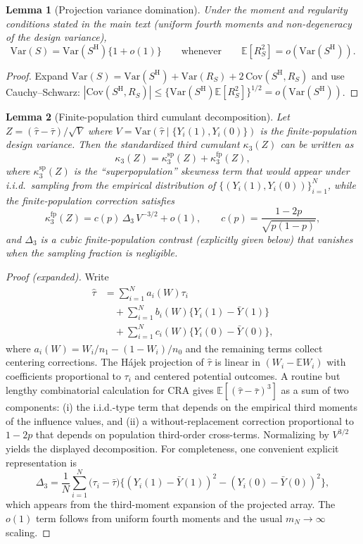 \documentclass[aos]{imsart}
\newtheorem{lemma}{Lemma}
\theoremstyle{definition}
\theoremstyle{plain}
\begin{document}
\begin{lemma}[Projection variance domination]\label{lem:hajek-var}
Under the moment and regularity conditions stated in the main text (uniform fourth moments and non-degeneracy of the design variance),
\[
\mathrm{Var}(S)=\mathrm{Var}(S^\mathrm{H})\{1+o(1)\}\qquad\text{whenever}\qquad \mathbb E[R_S^2]=o(\mathrm{Var}(S^\mathrm{H})).
\]
\end{lemma}

\begin{proof}
Expand $\mathrm{Var}(S)=\mathrm{Var}(S^\mathrm{H})+\mathrm{Var}(R_S)+2\,\mathrm{Cov}(S^\mathrm{H},R_S)$ and use Cauchy--Schwarz:
$|\mathrm{Cov}(S^\mathrm{H},R_S)|\le \{\mathrm{Var}(S^\mathrm{H})\mathbb E[R_S^2]\}^{1/2}=o(\mathrm{Var}(S^\mathrm{H}))$.
\end{proof}

\begin{lemma}[Finite-population third cumulant decomposition]\label{lem:fp-third-cumulant}
Let $Z=(\hat\tau-\bar\tau)/\sqrt{V}$ where $V=\mathrm{Var}(\hat\tau\mid\{Y_i(1),Y_i(0)\})$ is the finite-population design variance.
Then the standardized third cumulant $\kappa_3(Z)$ can be written as
\[
\kappa_3(Z)=\kappa_3^\mathrm{sp}(Z)+\kappa_3^\mathrm{fp}(Z),
\]
where $\kappa_3^\mathrm{sp}(Z)$ is the ``superpopulation'' skewness term that would appear under i.i.d.\ sampling from the empirical
distribution of $\{(Y_i(1),Y_i(0))\}_{i=1}^N$, while the finite-population correction satisfies
\[
\kappa_3^\mathrm{fp}(Z)=c(p)\,\Delta_3\,V^{-3/2}+o(1),
\qquad c(p)=\frac{1-2p}{\sqrt{p(1-p)}},
\]
and $\Delta_3$ is a cubic finite-population contrast (explicitly given below) that vanishes when the sampling fraction is negligible.
\end{lemma}

\begin{proof}[Proof (expanded)]
Write
\[
\begin{aligned}
\hat\tau &= \sum_{i=1}^N a_i(W) \tau_i \\
&\quad + \sum_{i=1}^N b_i(W)\{Y_i(1)-\bar Y(1)\} \\
&\quad + \sum_{i=1}^N c_i(W)\{Y_i(0)-\bar Y(0)\},
\end{aligned}
\]
where $a_i(W)=W_i/n_1-(1-W_i)/n_0$ and the remaining terms collect centering corrections.
The Hájek projection of $\hat\tau$ is linear in $(W_i-\mathbb EW_i)$ with coefficients proportional to $\tau_i$ and centered potential outcomes.
A routine but lengthy combinatorial calculation for CRA gives $\mathbb E[(\hat\tau-\bar\tau)^3]$ as a sum of two components:
(i) the i.i.d.-type term that depends on the empirical third moments of the influence values, and (ii) a without-replacement correction
proportional to $1-2p$ that depends on population third-order cross-terms. Normalizing by $V^{3/2}$ yields the displayed decomposition.
For completeness, one convenient explicit representation is
\[
\Delta_3=\frac{1}{N}\sum_{i=1}^N \Big(\tau_i-\bar\tau\Big)\Big\{(Y_i(1)-\bar Y(1))^2-(Y_i(0)-\bar Y(0))^2\Big\},
\]
which appears from the third-moment expansion of the projected array. The $o(1)$ term follows from uniform fourth moments and the
usual $m_N\to\infty$ scaling.
\end{proof}
\end{document}
